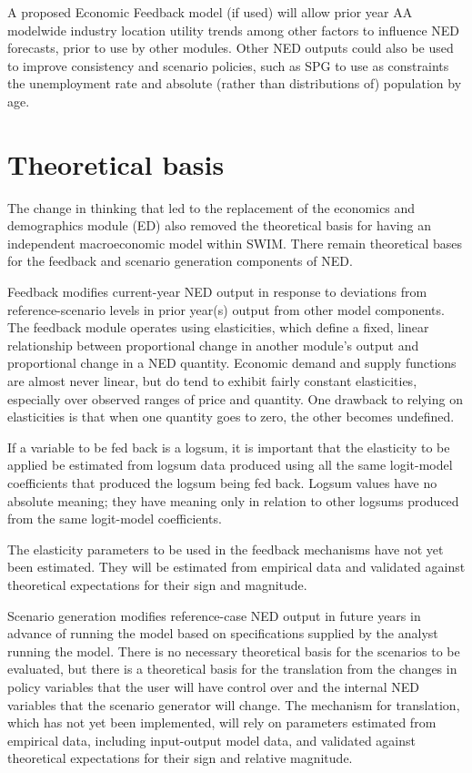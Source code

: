 A proposed Economic Feedback model (if used) will allow prior year AA modelwide industry location utility trends among other factors to influence NED forecasts, prior to use by other modules. Other NED outputs could also be used to improve consistency and scenario policies, such as SPG to use as constraints the unemployment rate and absolute (rather than distributions of) population by age. 

\section{Theoretical basis}
The change in thinking that led to the replacement of the economics and demographics module (ED) also removed the theoretical basis for having an independent macroeconomic model within SWIM. There remain theoretical bases for the feedback and scenario generation components of NED. 

Feedback modifies current-year NED output in response to deviations from reference-scenario levels in prior year(s) output from other model components. The feedback module operates using elasticities, which define a fixed, linear relationship between proportional change in another module's output and proportional change in a NED quantity. Economic demand and supply functions are almost never linear, but do tend to exhibit fairly constant elasticities, especially over observed ranges of price and quantity. One drawback to relying on elasticities is that when one quantity goes to zero, the other becomes undefined.

If a variable to be fed back is a logsum, it is important that the elasticity to be applied be estimated from logsum data produced using all the same logit-model coefficients that produced the logsum being fed back. Logsum values have no absolute meaning; they have meaning only in relation to other logsums produced from the same logit-model coefficients.

The elasticity parameters to be used in the feedback mechanisms have not yet been estimated. They will be estimated from empirical data and validated against theoretical expectations for their sign and magnitude.

Scenario generation modifies reference-case NED output in future years in advance of running the model based on specifications supplied by the analyst running the model. There is no necessary theoretical basis for the scenarios to be evaluated, but there is a theoretical basis for the translation from the changes in policy variables that the user will have control over and the internal NED variables that the scenario generator will change. The mechanism for translation, which has not yet been implemented, will rely on parameters estimated from empirical data, including input-output model data, and validated against theoretical expectations for their sign and relative magnitude.

